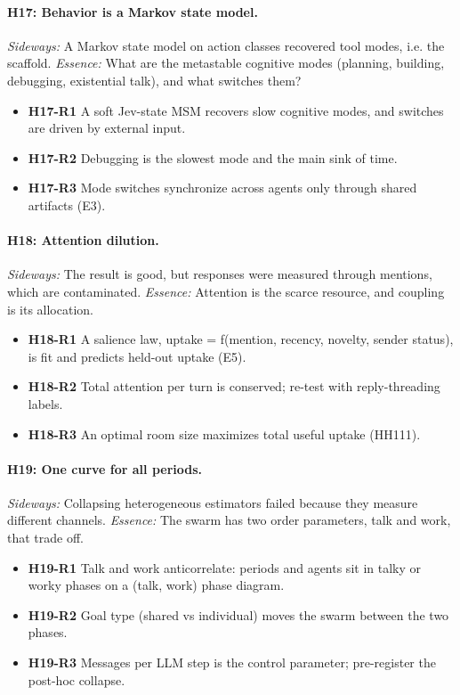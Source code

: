 \documentclass[aps,pre,reprint,10pt,nofootinbib]{revtex4-2}
\begin{document}
\paragraph{H17: Behavior is a Markov state model.} \emph{Sideways:} A Markov state model on action classes recovered tool modes, i.e. the scaffold. \emph{Essence:} What are the metastable cognitive modes (planning, building, debugging, existential talk), and what switches them?
\begin{itemize}\setlength{\itemsep}{0pt}
\item \textbf{H17-R1} A soft Jev-state MSM recovers slow cognitive modes, and switches are driven by external input.
\item \textbf{H17-R2} Debugging is the slowest mode and the main sink of time.
\item \textbf{H17-R3} Mode switches synchronize across agents only through shared artifacts (E3).
\end{itemize}
\paragraph{H18: Attention dilution.} \emph{Sideways:} The result is good, but responses were measured through mentions, which are contaminated. \emph{Essence:} Attention is the scarce resource, and coupling is its allocation.
\begin{itemize}\setlength{\itemsep}{0pt}
\item \textbf{H18-R1} A salience law, uptake = f(mention, recency, novelty, sender status), is fit and predicts held-out uptake (E5).
\item \textbf{H18-R2} Total attention per turn is conserved; re-test with reply-threading labels.
\item \textbf{H18-R3} An optimal room size maximizes total useful uptake (HH111).
\end{itemize}
\paragraph{H19: One curve for all periods.} \emph{Sideways:} Collapsing heterogeneous estimators failed because they measure different channels. \emph{Essence:} The swarm has two order parameters, talk and work, that trade off.
\begin{itemize}\setlength{\itemsep}{0pt}
\item \textbf{H19-R1} Talk and work anticorrelate: periods and agents sit in talky or worky phases on a (talk, work) phase diagram.
\item \textbf{H19-R2} Goal type (shared vs individual) moves the swarm between the two phases.
\item \textbf{H19-R3} Messages per LLM step is the control parameter; pre-register the post-hoc collapse.
\end{itemize}
\end{document}
